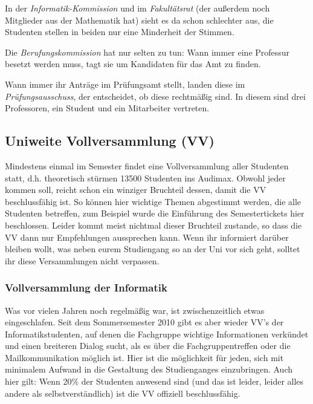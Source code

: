 \begin{multicols}{2}
		In der \emph{Informatik-Kommission} und im \emph{Fakultätsrat} (der außerdem noch Mitglieder aus der Mathematik hat) sieht es da schon schlechter aus, die Studenten stellen in beiden nur eine Minderheit der Stimmen.

		Die \emph{Berufungskommission} hat nur selten zu tun: Wann immer eine Professur besetzt werden muss, tagt sie um Kandidaten für das Amt zu finden.

		Wann immer ihr Anträge im Prüfungsamt stellt, landen diese im \emph{Prüfungsausschuss}, der entscheidet, ob diese rechtmäßig sind. In diesem sind drei Professoren, ein Student und ein Mitarbeiter vertreten.

	\subsection*{Uniweite Vollversammlung (VV)}
		Mindestens einmal im Semester findet eine Vollversammlung aller Studenten statt, d.h. theoretisch stürmen 13500 Studenten ins Audimax. Obwohl jeder kommen soll, reicht schon ein winziger Bruchteil dessen, damit die VV beschlussfähig ist. So können hier wichtige Themen abgestimmt werden, die alle Studenten betreffen, zum Beispiel wurde die Einführung des Semestertickets hier beschlossen. Leider kommt meist nichtmal dieser Bruchteil zustande, so dass die VV dann nur Empfehlungen aussprechen kann. Wenn ihr informiert darüber bleiben wollt, was neben eurem Studiengang so an der Uni vor sich geht, solltet ihr diese Versammlungen nicht verpassen.

		\subsubsection*{Vollversammlung der Informatik}
			Was vor vielen Jahren noch regelmäßig war, ist zwischenzeitlich etwas eingeschlafen. Seit dem Sommersemester 2010 gibt es aber wieder VV's der Informatikstudenten, auf denen die Fachgruppe wichtige Informationen verkündet und einen breiteren Dialog sucht, als es über die Fachgruppentreffen oder die Mailkommunikation möglich ist. Hier ist die möglichkeit für jeden, sich mit minimalem Aufwand in die Gestaltung des Studienganges einzubringen. Auch hier gilt: Wenn 20\% der Studenten anwesend sind (und das ist leider, leider alles andere als selbstverständlich) ist die VV offiziell beschlussfähig.
\end{multicols}
